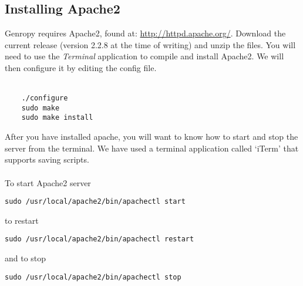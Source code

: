 \subsection{Installing Apache2} %
\label{sub:installing_apache2}

Genropy requires Apache2, found at: \url{http://httpd.apache.org/}. Download the current release (version 2.2.8 at the time of writing) and unzip the files.
You will need to use the \emph{Terminal} application to compile and install Apache2.  We will then configure it by editing the config file.
\\
\\






\begin{verbatim}
	./configure
	sudo make
	sudo make install
\end{verbatim}

After you have installed apache, you will want to know how to start and stop the server from the terminal.  We have used a terminal application called `iTerm' that supports saving scripts.\\ \\

To start Apache2 server
\begin{verbatim}
sudo /usr/local/apache2/bin/apachectl start
\end{verbatim}

to restart
\begin{verbatim}
sudo /usr/local/apache2/bin/apachectl restart
\end{verbatim}

and to stop
\begin{verbatim}
sudo /usr/local/apache2/bin/apachectl stop
\end{verbatim}
\^\\

